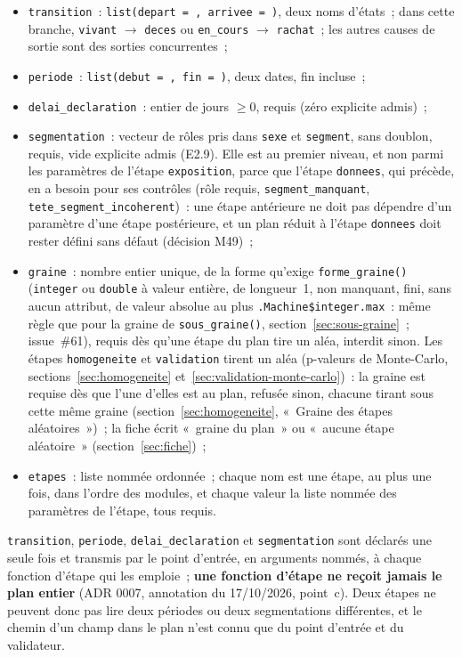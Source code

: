 \documentclass[a4paper,11pt]{article}
\newcommand{\code}[1]{\texttt{\small #1}}
\begin{document}
\begin{itemize}[leftmargin=*, itemsep=2pt]
  \item \code{transition}~: \code{list(depart = , arrivee = )}, deux noms
    d'états~; dans cette branche, \code{vivant} $\to$ \code{deces} ou
    \code{en\_cours} $\to$ \code{rachat}~; les autres causes de sortie sont des
    sorties concurrentes~;
  \item \code{periode}~: \code{list(debut = , fin = )}, deux dates, fin
    incluse~;
  \item \code{delai\_declaration}~: entier de jours $\ge 0$, requis (zéro
    explicite admis)~;
  \item \code{segmentation}~: vecteur de rôles pris dans \code{sexe} et
    \code{segment}, sans doublon, requis, vide explicite admis (E2.9). Elle est
    au premier niveau, et non parmi les paramètres de l'étape
    \code{exposition}, parce que l'étape \code{donnees}, qui précède, en a
    besoin pour ses contrôles (rôle requis, \code{segment\_manquant},
    \code{tete\_segment\_incoherent})~: une étape antérieure ne doit pas
    dépendre d'un paramètre d'une étape postérieure, et un plan réduit à
    l'étape \code{donnees} doit rester défini sans défaut (décision M49)~;
  \item \code{graine}~: nombre entier unique, de la forme qu'exige
    \code{forme\_graine()} (\code{integer} ou \code{double} à valeur
    entière, de longueur~1, non manquant, fini, sans aucun attribut, de
    valeur absolue au plus \code{.Machine\$integer.max}~: même règle que
    pour la graine de \code{sous\_graine()}, section~\ref{sec:sous-graine}~;
    issue~\#61), requis dès qu'une étape du plan tire un aléa,
    interdit sinon. Les étapes \code{homogeneite} et \code{validation}
    tirent un aléa (p-valeurs de Monte-Carlo,
    sections~\ref{sec:homogeneite} et~\ref{sec:validation-monte-carlo})~:
    la graine est requise dès que l'une d'elles est au plan, refusée
    sinon, chacune tirant sous cette même graine (section~\ref{sec:homogeneite},
    «~Graine des étapes aléatoires~»)~;
    la fiche écrit «~graine du plan~» ou «~aucune étape aléatoire~»
    (section~\ref{sec:fiche})~;
  \item \code{etapes}~: liste nommée ordonnée~; chaque nom est une étape, au
    plus une fois, dans l'ordre des modules, et chaque valeur la liste nommée
    des paramètres de l'étape, tous requis.
\end{itemize}

\noindent
\code{transition}, \code{periode}, \code{delai\_declaration} et
\code{segmentation} sont déclarés une seule fois et transmis par le point
d'entrée, en arguments nommés, à chaque fonction d'étape qui les emploie~;
\textbf{une fonction d'étape ne reçoit jamais le plan entier} (ADR 0007,
annotation du 17/10/2026, point~c). Deux étapes ne peuvent donc pas lire deux
périodes ou deux segmentations différentes, et le chemin d'un champ dans le
plan n'est connu que du point d'entrée et du validateur.
\end{document}
